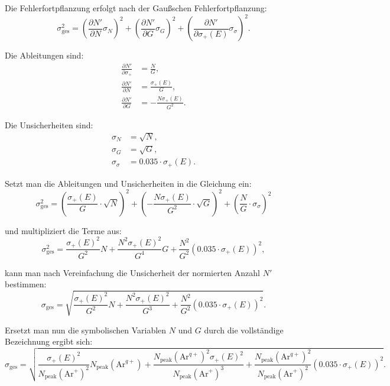 Die Fehlerfortpflanzung erfolgt nach der Gaußschen Fehlerfortpflanzung:
\begin{equation}
    \sigma_\text{ges}^2 = \left( \frac{\partial N'}{\partial N} \sigma_N \right)^2 +
                     \left( \frac{\partial N'}{\partial G} \sigma_G \right)^2 +
                     \left( \frac{\partial N'}{\partial \sigma_+(E)} \sigma_\sigma \right)^2.
\end{equation}

Die Ableitungen sind:
\begin{align*}
    \frac{\partial N'}{\partial \sigma_+} &= \frac{N}{G}, \\
    \frac{\partial N'}{\partial N} &= \frac{\sigma_+(E)}{G}, \\
    \frac{\partial N'}{\partial G} &= -\frac{N \sigma_+(E)}{G^2}.
\end{align*}

Die Unsicherheiten sind:
\begin{align*}
    \sigma_N &= \sqrt{N}, \\
    \sigma_G &= \sqrt{G}, \\
    \sigma_\sigma &= 0.035 \cdot \sigma_+(E).
\end{align*}

Setzt man die Ableitungen und Unsicherheiten in die Gleichung ein:
\begin{equation}
    \sigma_\text{ges}^2 = \left(\frac{\sigma_+(E)}{G} \cdot \sqrt{N} \right)^2 +
                    \left(-\frac{N \sigma_+(E)}{G^2} \cdot \sqrt{G} \right)^2 +
                    \left(\frac{N}{G} \cdot \sigma_\sigma \right)^2
\end{equation}

und multipliziert die Terme aus:
\begin{equation}
    \sigma_\text{ges}^2 = \frac{\sigma_+(E)^2}{G^2} N + \frac{N^2 \sigma_+(E)^2}{G^4} G + \frac{N^2}{G^2} (0.035 \cdot \sigma_+(E))^2,
\end{equation}

kann man nach Vereinfachung die Unsicherheit der normierten Anzahl $N'$ bestimmen:
\begin{equation}
    \sigma_\text{ges} = \sqrt{\frac{\sigma_+(E)^2}{G^2} N + \frac{N^2 \sigma_+(E)^2}{G^3} + \frac{N^2}{G^2} (0.035 \cdot \sigma_+(E))^2}.
\end{equation}

Ersetzt man nun die symbolischen Variablen $N$ und $G$ durch die vollständige Bezeichnung ergibt sich:
\begin{equation}
    \sigma_\text{ges} = \sqrt{\frac{\sigma_+(E)^2}{N_\text{peak}(\text{Ar}^{+})^2} N_\text{peak}(\text{Ar}^{q+}) + \frac{N_\text{peak}(\text{Ar}^{q+})^2 \sigma_+(E)^2}{N_\text{peak}(\text{Ar}^{+})^3} + \frac{N_\text{peak}(\text{Ar}^{q+})^2}{N_\text{peak}(\text{Ar}^{+})^2} (0.035 \cdot \sigma_+(E))^2}.
\end{equation}

